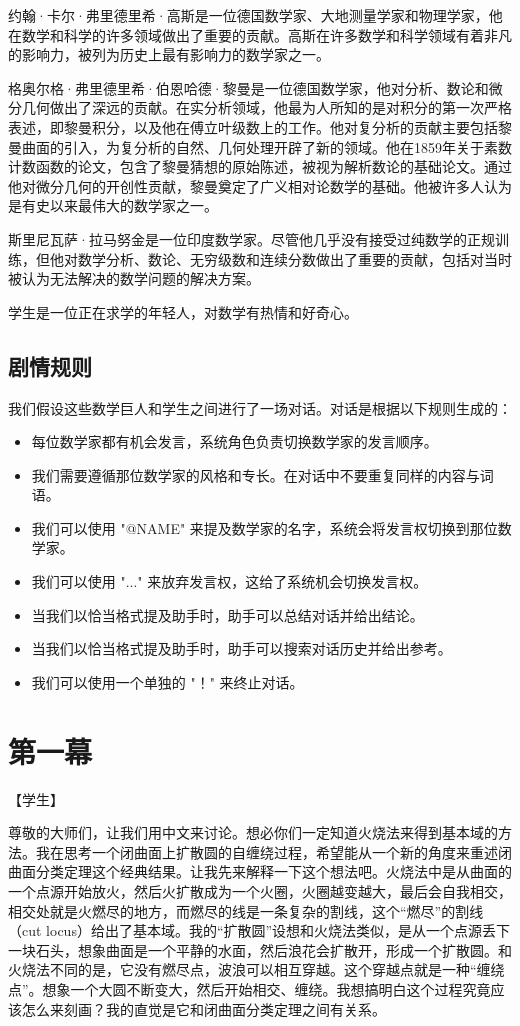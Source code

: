 \documentclass[
    fontsize=24pt, %
	twoside=false, %
	secnumdepth=0, %
    paper=b5paper, %
]{kaobook}
\begin{document}
约翰·卡尔·弗里德里希·高斯是一位德国数学家、大地测量学家和物理学家，他在数学和科学的许多领域做出了重要的贡献。高斯在许多数学和科学领域有着非凡的影响力，被列为历史上最有影响力的数学家之一。

格奥尔格·弗里德里希·伯恩哈德·黎曼是一位德国数学家，他对分析、数论和微分几何做出了深远的贡献。在实分析领域，他最为人所知的是对积分的第一次严格表述，即黎曼积分，以及他在傅立叶级数上的工作。他对复分析的贡献主要包括黎曼曲面的引入，为复分析的自然、几何处理开辟了新的领域。他在1859年关于素数计数函数的论文，包含了黎曼猜想的原始陈述，被视为解析数论的基础论文。通过他对微分几何的开创性贡献，黎曼奠定了广义相对论数学的基础。他被许多人认为是有史以来最伟大的数学家之一。

斯里尼瓦萨·拉马努金是一位印度数学家。尽管他几乎没有接受过纯数学的正规训练，但他对数学分析、数论、无穷级数和连续分数做出了重要的贡献，包括对当时被认为无法解决的数学问题的解决方案。

学生是一位正在求学的年轻人，对数学有热情和好奇心。

\section{剧情规则}

我们假设这些数学巨人和学生之间进行了一场对话。对话是根据以下规则生成的：
\begin{itemize}
\item 每位数学家都有机会发言，系统角色负责切换数学家的发言顺序。
\item 我们需要遵循那位数学家的风格和专长。在对话中不要重复同样的内容与词语。
\item 我们可以使用 "@NAME" 来提及数学家的名字，系统会将发言权切换到那位数学家。
\item 我们可以使用 "..." 来放弃发言权，这给了系统机会切换发言权。
\item 当我们以恰当格式提及助手时，助手可以总结对话并给出结论。
\item 当我们以恰当格式提及助手时，助手可以搜索对话历史并给出参考。
\item 我们可以使用一个单独的 "！" 来终止对话。
\end{itemize}

\chapter{第一幕}

【学生】

尊敬的大师们，让我们用中文来讨论。想必你们一定知道火烧法来得到基本域的方法。我在思考一个闭曲面上扩散圆的自缠绕过程，希望能从一个新的角度来重述闭曲面分类定理这个经典结果。让我先来解释一下这个想法吧。火烧法中是从曲面的一个点源开始放火，然后火扩散成为一个火圈，火圈越变越大，最后会自我相交，相交处就是火燃尽的地方，而燃尽的线是一条复杂的割线，这个“燃尽”的割线（cut locus）给出了基本域。我的“扩散圆”设想和火烧法类似，是从一个点源丢下一块石头，想象曲面是一个平静的水面，然后浪花会扩散开，形成一个扩散圆。和火烧法不同的是，它没有燃尽点，波浪可以相互穿越。这个穿越点就是一种“缠绕点”。想象一个大圆不断变大，然后开始相交、缠绕。我想搞明白这个过程究竟应该怎么来刻画？我的直觉是它和闭曲面分类定理之间有关系。


\backmatter
\end{document}
